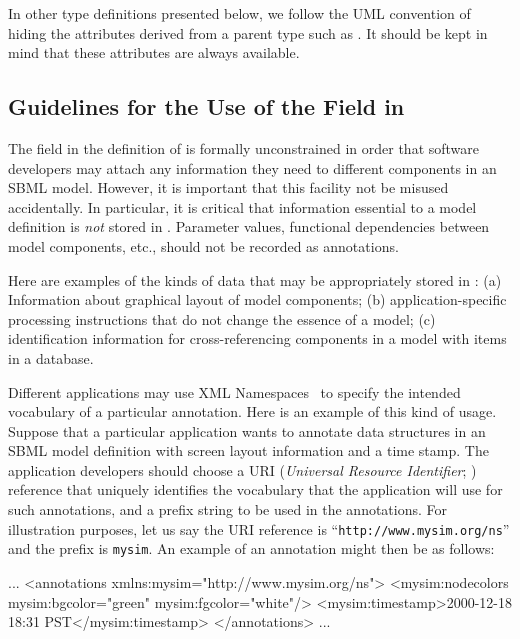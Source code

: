 \documentclass[10pt]{cekarticle}
\begin{document}
In other type definitions presented below, we follow the UML
convention of hiding the attributes derived from a parent type
such as . It should be kept in mind that these
attributes are always available.

\subsection{Guidelines for the Use of the  Field in
  }

The  field in the definition of  is
formally unconstrained in order that software developers may attach any
information they need to different components in an SBML model. However,
it is important that this facility not be misused accidentally.  In
particular, it is critical that information essential to a model definition
is \emph{not} stored in .  Parameter values, functional
dependencies between model components, etc., should not be recorded as
annotations.

Here are examples of the kinds of data that may be appropriately
stored in : (a) Information about graphical
layout of model components; (b) application-specific processing
instructions that do not change the essence of a model; (c)
identification information for cross-referencing components in a
model with items in a database.

Different applications may use XML Namespaces~\citep{bray:1999} to specify
the intended vocabulary of a particular annotation.  Here is an example of
this kind of usage.  Suppose that a particular application wants to
annotate data structures in an SBML model definition with screen layout
information and a time stamp.  The application developers should choose a
URI (\emph{Universal Resource Identifier}; \citealt{harold:2001,w3c:2000})
reference that uniquely identifies the vocabulary that the
application will use for such annotations, and a prefix string to be used
in the annotations.  For illustration purposes, let us say the URI
reference is ``\texttt{http://www.mysim.org/ns}'' and the prefix is
\texttt{mysim}.  An example of an annotation might then be as follows:

\begin{example}
...
<annotations xmlns:mysim="http://www.mysim.org/ns">
    <mysim:nodecolors mysim:bgcolor="green" mysim:fgcolor="white"/>
    <mysim:timestamp>2000-12-18 18:31 PST</mysim:timestamp>
</annotations>
...
\end{example}
\end{document}
